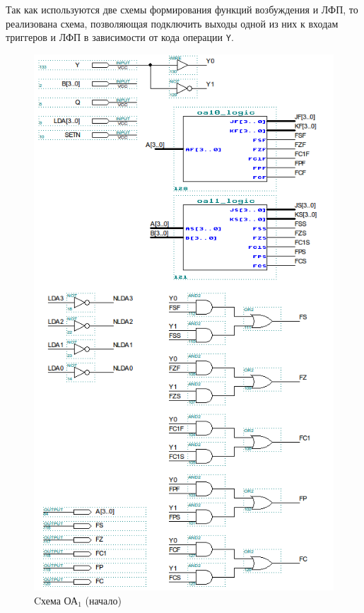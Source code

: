 Так как используются две схемы формирования функций возбуждения и ЛФП, то реализована схема, позволяющая подключить выходы одной из них к входам триггеров и ЛФП в зависимости от кода операции \texttt{Y}.

\begin{figure}[H]
	\includegraphics[scale=0.6]{images/altera/rev2/oa1_1_WITH_CONTROL_SIGNAL.png}
	\caption{Cхема ОА$_{1}$ (начало)}
	\label{figure:oa1-1log}
\end{figure}

